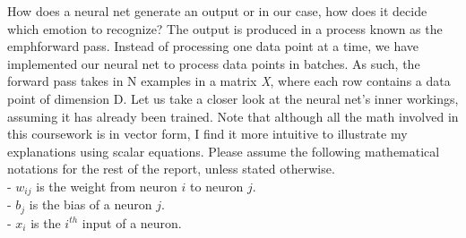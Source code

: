 How does a neural net generate an output or in our case, how does it decide which emotion to recognize?
The output is produced in a process known as the emph{forward pass}.
Instead of processing one data point at a time,
we have implemented our neural net to process data points in batches.
As such, the forward pass takes in N examples in a matrix \emph{X}, where each row contains a data point of dimension D.
Let us take a closer look at the neural net's inner workings, assuming it has already been trained.
Note that although all the math involved in this coursework is in vector form, I find it more intuitive to illustrate my explanations
using scalar equations.
Please assume the following mathematical notations for the rest of the report, unless stated otherwise.\\
\- - $w_{ij}$ is the weight from neuron $i$ to neuron $j$.\\
\- - $b_j$ is the bias of a neuron $j$.\\
\- - $x_i$ is the $i^{th}$ input of a neuron.
